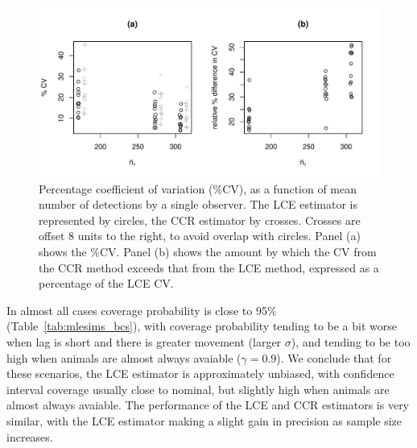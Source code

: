 \documentclass[useAMS, usenatbib, referee]{biom}\usepackage[]{graphicx}\usepackage[]{color}
\makeatletter
\def\maxwidth{ %
  \ifdim\Gin@nat@width>\linewidth
    \linewidth
  \else
    \Gin@nat@width
  \fi
}
\newenvironment{knitrout}{}{} %
\makeatother
\begin{document}


\begin{knitrout}
\color{fgcolor}\begin{figure}

{\centering \includegraphics[width=\maxwidth]{figs/fig_mlepalm_cv_bcs-1} 

}

\caption[Percentage coefficient of variation (\%CV), as a function of mean number of detections by a single observer]{Percentage coefficient of variation (\%CV), as a function of mean number of detections by a single observer. The LCE estimator is represented by circles, the CCR estimator by crosses. Crosses are offset 8 units to the right, to avoid overlap with circles. Panel (a) shows the \%CV. Panel (b) shows the amount by which the CV from the CCR method exceeds that from the LCE method, expressed as a percentage of the LCE CV.}\label{fig:fig_mlepalm_cv_bcs}
\end{figure}


\end{knitrout}


In almost all cases coverage probability is close to 95\% (Table~\ref{tab:mlesims_bcs}), with coverage probability tending to be a bit worse when lag is short and there is greater movement (larger $\sigma$), and tending to be too high when animals are almost always avaiable ($\gamma=0.9$). We conclude that for these scenarios, the LCE estimator is approximately unbiased, with confidence interval coverage usually close to nominal, but slightly high when animals are almost always avaiable. The performance of the LCE and CCR estimators is very similar, with the LCE estimator making a slight gain in precision as sample size increases.
\end{document}
